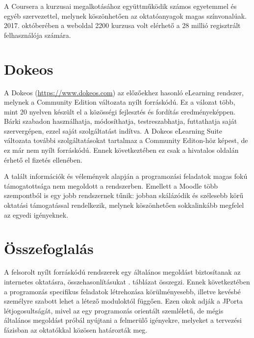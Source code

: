 A Coursera a kurzusai megalkotásához együttműködik számos egyetemmel és egyéb szervezettel, melynek köszönhetően az oktatóanyagok magas színvonalúak. 2017. októberében a weboldal 2200 kurzusa volt elérhető a 28 millió regisztrált felhasználója számára.

\section{Dokeos}

A Dokeos (\url{https://www.dokeos.com}) az előzőekhez hasonló eLearning rendszer, melynek a Community Edition változata nyílt forráskódú. Ez a válozat több, mint 20 nyelven készült el a közösségi fejlesztés és fordítás eredményeképpen. Bárki szabadon használhatja, módosíthatja, testreszabhatja, futtathatja saját szervergépen, ezzel saját szolgáltatást indítva. A Dokeos eLearning Suite változata további szolgáltatásokat tartalmaz a Community Editon-höz képest, de ez már nem nyílt forráskódú. Ennek következtében ez csak a hivatalos oldalán érhető el fizetés ellenében.

A talált információk és vélemények alapján a programozási feladatok magas fokú támogatottsága nem megoldott a rendszerben. Emellett a Moodle több szempontból is egy jobb rendszernek tűnik:  jobban skálázódik és szélesebb körű oktatási támogatással rendelkezik, melynek köszönhetően sokkalinkább megfelel az egyedi igényeknek. \cite{DokeosVsMoodle}

\section{Összefoglalás}

A felsorolt nyílt forráskódú rendszerek egy általános megoldást biztosítanak az internetes oktatásra, összehasonlításukat . táblázat összegzi. Ennek következtében a programozás specifikus feladatok létrehozása körülményesebb, illetve kevésbé személyre szabott lehet a létező moduloktól függően. Ezen okok adják a JPorta létjogosultságát, mivel az egy programozás orientált szemléletű, de mégis általános megoldást próbál nyújtani a felmerülő igényekre, melyeket a tervezési fázisban az oktatókkal közösen határozták meg.

